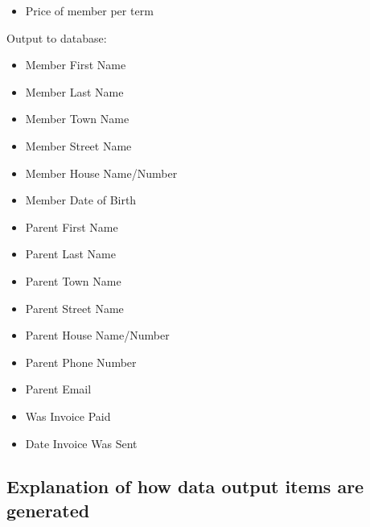 \begin{itemize}
	\item Price of member per term
\end{itemize}
Output to database:
\begin{itemize}
	\item Member First Name
	\item Member Last Name
	\item Member Town Name
	\item Member Street Name
	\item Member House Name/Number
	\item Member Date of Birth
	\item Parent First Name
	\item Parent Last Name
	\item Parent Town Name
	\item Parent Street Name
	\item Parent House Name/Number
	\item Parent Phone Number
	\item Parent Email
	\item Was Invoice Paid
	\item Date Invoice Was Sent
\end{itemize}

\subsection{Explanation of how data output items are generated}

